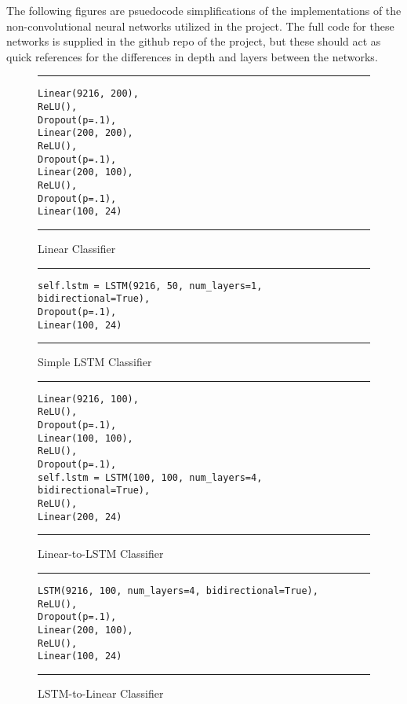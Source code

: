 The following figures are psuedocode simplifications of the implementations of the non-convolutional neural networks utilized in the project. The full code for these networks is supplied in the github repo \cite{Git} of the project, but these should act as quick references for the differences in depth and layers between the networks.

\begin{figure}
  \caption{Linear Classifier}
  \label{fig:nnLinear}
  \par\noindent\rule{\textwidth}{0.5pt}
  \begin{\codefigsize}
  \begin{lstlisting}
Linear(9216, 200),
ReLU(),
Dropout(p=.1),
Linear(200, 200),
ReLU(),
Dropout(p=.1),
Linear(200, 100),
ReLU(),
Dropout(p=.1),
Linear(100, 24)
  \end{lstlisting}
  \end{\codefigsize}
  \par\noindent\rule{\textwidth}{0.5pt}
\end{figure}

\begin{figure}
  \caption{Simple LSTM Classifier}
  \label{fig:nnSimpleLSTM}
  \par\noindent\rule{\textwidth}{0.5pt}
  \begin{\codefigsize}
  \begin{lstlisting}
self.lstm = LSTM(9216, 50, num_layers=1, bidirectional=True),
Dropout(p=.1),
Linear(100, 24)
  \end{lstlisting}
  \end{\codefigsize}
  \par\noindent\rule{\textwidth}{0.5pt}
\end{figure}

\begin{figure}
  \caption{Linear-to-LSTM Classifier}
  \label{fig:nnLinear2LSTM}
  \par\noindent\rule{\textwidth}{0.5pt}
  \begin{\codefigsize}
  \begin{lstlisting}
Linear(9216, 100),
ReLU(),
Dropout(p=.1),
Linear(100, 100),
ReLU(),
Dropout(p=.1),
self.lstm = LSTM(100, 100, num_layers=4, bidirectional=True),
ReLU(),
Linear(200, 24)
  \end{lstlisting}
  \end{\codefigsize}
  \par\noindent\rule{\textwidth}{0.5pt}
\end{figure}

\begin{figure}
  \caption{LSTM-to-Linear Classifier}
  \label{fig:nnLSTM2Linear}
  \par\noindent\rule{\textwidth}{0.5pt}
  \begin{\codefigsize}
  \begin{lstlisting}
LSTM(9216, 100, num_layers=4, bidirectional=True),
ReLU(),
Dropout(p=.1),
Linear(200, 100),
ReLU(),
Linear(100, 24)
  \end{lstlisting}
  \end{\codefigsize}
  \par\noindent\rule{\textwidth}{0.5pt}
\end{figure}
